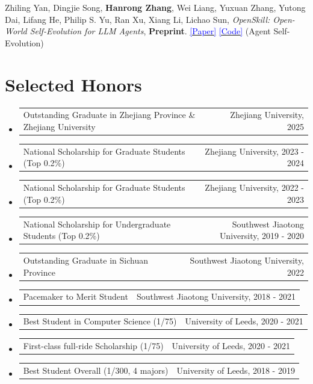 \documentclass[letterpaper,11pt]{article}
\makeatletter
\newcommand{\catg}[1]{{\footnotesize\textcolor{tagcolor}{#1}}}
\newcommand{\honor}[2]{
  \vspace{-2pt}\item
    \begin{tabular*}{1.0\textwidth}[t]{l@{\extracolsep{\fill}}r}
      \small #1 & #2 \\
    \end{tabular*}\vspace{-13pt}
}
\newcommand{\honorLast}[2]{
  \vspace{-2pt}\item
    \begin{tabular*}{1.0\textwidth}[t]{l@{\extracolsep{\fill}}r}
      \small #1 & #2 \\
    \end{tabular*}\vspace{-5pt}
}
\newcommand{\resumeSubHeadingListStart}{\begin{itemize}[leftmargin=0.0in, label={}]}
\newcommand{\resumeSubHeadingListEnd}{\end{itemize}}
\makeatother
\begin{document}
\begin{enumerate}[itemsep=5pt, topsep=5pt, parsep=1pt, leftmargin=*, label={[\arabic*]}]
    \item \small{Zhiling Yan, Dingjie Song, \textbf{Hanrong Zhang}, Wei Liang, Yuxuan Zhang, Yutong Dai, Lifang He, Philip S. Yu, Ran Xu, Xiang Li, Lichao Sun, \textit{OpenSkill: Open-World Self-Evolution for LLM Agents}, \textbf{Preprint}. \href{https://arxiv.org/abs/2606.06741}{\textcolor{blue}{[Paper]}} \href{https://github.com/OpenLAIR/OpenSkill}{\textcolor{blue}{[Code]}} \catg{(Agent Self-Evolution)}}
\end{enumerate}

\section{Selected Honors}
  \resumeSubHeadingListStart
    \honor {Outstanding Graduate in Zhejiang Province \& Zhejiang University}{Zhejiang University, 2025}
    \honor {National Scholarship for Graduate Students (Top 0.2\%)}{Zhejiang University, 2023 - 2024}
    \honor {National Scholarship for Graduate Students (Top 0.2\%)}{Zhejiang University, 2022 - 2023}
    \honor {National Scholarship for Undergraduate Students (Top 0.2\%)}{Southwest Jiaotong University, 2019 - 2020}
    \honor {Outstanding Graduate in Sichuan Province}{Southwest Jiaotong University, 2022}
    \honor {Pacemaker to Merit Student}{Southwest Jiaotong University, 2018 - 2021}
    \honor {Best Student in Computer Science (1/75)}{University of Leeds, 2020 - 2021}
    \honor {First-class full-ride Scholarship (1/75)}{University of Leeds, 2020 - 2021}
    \honorLast {Best Student Overall (1/300, 4 majors)}{University of Leeds, 2018 - 2019}
  \resumeSubHeadingListEnd
\end{document}
